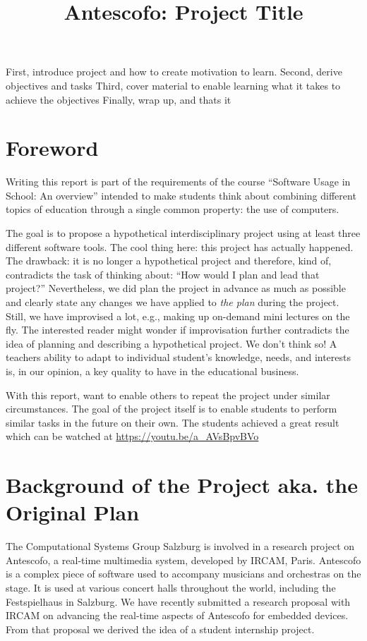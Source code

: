 \documentclass[onecolumn,nocopyrightspace,preprint]{sigplanconf}
\title{Antescofo: Project Title}
\begin{document}
\maketitle


First, introduce project and how to create motivation to learn.
Second, derive objectives and tasks
Third, cover material to enable learning what it takes to achieve the objectives
Finally, wrap up, and thats it


\section{Foreword}  

Writing this report is part of the requirements of the course ``Software Usage
in School: An overview'' intended to make students think about combining
different topics of education through a single common property: the use of
computers.

The goal is to propose a hypothetical interdisciplinary project using at least
three different software tools. The cool thing here: this project has actually
happened. The drawback: it is no longer a hypothetical project and therefore,
kind of, contradicts the task of thinking about: ``How would I plan and lead
that project?'' Nevertheless, we did plan the project in advance as much as
possible and clearly state any changes we have applied  to \textit{the plan}
during the project. Still, we have improvised a lot, e.g., making up on-demand
mini lectures on the fly. The interested reader might wonder if improvisation
further contradicts the idea of planning and describing a hypothetical
project.  We don't think so! A teachers ability to adapt to individual
student's knowledge, needs, and interests is, in our opinion, a key quality to
have in the educational business.

With this report, want to enable others to repeat the project under similar
circumstances. The goal of the project itself is to enable students to perform
similar tasks in the future on their own.  The students achieved a great
result which can be watched at \url{https://youtu.be/a_AVsBpvBVo}

\section{Background of the Project aka. the Original Plan}\label{sec:background}

The Computational Systems Group Salzburg is involved in a research project on
Antescofo, a real-time multimedia system, developed by IRCAM, Paris. Antescofo
is a complex piece of software used to accompany musicians and orchestras on
the stage. It is used at various concert halls throughout the world, including
the Festspielhaus in Salzburg. We have recently submitted a research proposal
with IRCAM on advancing the real-time aspects of Antescofo for embedded
devices. From that proposal we derived the idea of a student internship
project.
\end{document}
